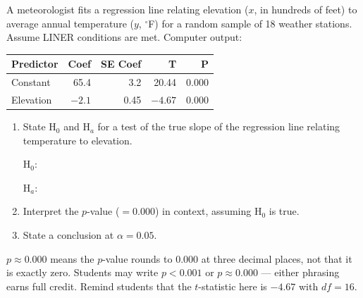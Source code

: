 \documentclass[10pt]{article}
\begin{document}
\namedateperiod

\vspace{0.1in}

A meteorologist fits a regression line relating elevation ($x$, in hundreds of feet)
to average annual temperature ($y$, ${}^\circ$F) for a random sample of 18 weather
stations. Assume LINER conditions are met. Computer output:

\begin{center}
\renewcommand{\arraystretch}{1.4}
\begin{tabular}{lrrrr}
    \textbf{Predictor} & \textbf{Coef} & \textbf{SE Coef} & \textbf{T} & \textbf{P} \\
    \hline
    Constant   & 65.4 & 3.2  & 20.44 & 0.000 \\
    Elevation  & $-2.1$ & 0.45 & $-4.67$ & 0.000 \\
\end{tabular}
\end{center}

\begin{enumerate}

  \item State H$_0$ and H$_a$ for a test of the true slope of the regression line
        relating temperature to elevation.

        H$_0$: 

        \vspace{0.05in}

        H$_a$: 

        \vspace{0.1in}

  \item Interpret the $p$-value ($= 0.000$) in context, assuming H$_0$ is true.


  \item State a conclusion at $\alpha = 0.05$.


\end{enumerate}

\begin{teachernote}
$p \approx 0.000$ means the $p$-value rounds to 0.000 at three decimal places, not that
it is exactly zero. Students may write $p < 0.001$ or $p \approx 0.000$ --- either phrasing
earns full credit. Remind students that the $t$-statistic here is $-4.67$ with $df = 16$.
\end{teachernote}
\end{document}
